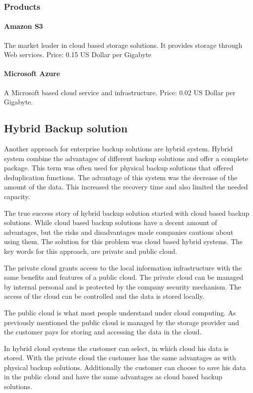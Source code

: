\subsubsection{Products}

\paragraph{Amazon S3} The market leader in cloud based storage
solutions. It provides storage through Web services. Price: 0.15 US
Dollar per Gigabyte

\paragraph{Microsoft Azure} A Microsoft based cloud service and
infrastructure. Price: 0.02 US Dollar per Gigabyte.

\subsection{Hybrid Backup solution}
Another approach for enterprise backup solutions are hybrid system.
Hybrid system combine the advantages of different backup solutions and
offer a complete package. This term was often used for physical backup
solutions that offered deduplication functions. The advantage of this
system was the decrease of the amount of the data. This increased the
recovery time and also limited the needed capacity.

The true success story of hybrid backup solution started with cloud
based backup solutions. While cloud based backup solutions have a decent
amount of advantages, but the risks and disadvantages made companies
cautious about using them.  The solution for this problem was cloud
based hybrid systems. The key words for this approach, are private and
public cloud.

The private cloud  grants access to the local information infrastructure
with the same benefits and features of a public cloud.  The private
cloud can be managed by internal personal and is protected by the
company security mechanism.  The access of the cloud can be controlled
and the data is stored locally.

The public cloud is what most people understand under cloud computing.
As previously mentioned the public cloud is managed by the storage
provider and the customer pays for storing and accessing the data in the
cloud.

In hybrid cloud systems the customer can select, in which cloud his data
is stored. With the private cloud the customer has the same advantages
as with physical backup solutions. Additionally the customer can choose
to save his data in the public cloud and have the same advantages as
cloud based backup solutions.


